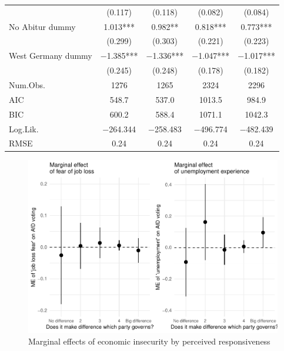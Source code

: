 \documentclass[
]{article}
\begin{document}
\begin{table}[!h]
\begin{tabular}[t]{lcccc}
 & (\num{0.117}) & (\num{0.118}) & (\num{0.082}) & (\num{0.084})\\
No Abitur dummy & \num{1.013}*** & \num{0.982}** & \num{0.818}*** & \num{0.773}***\\
 & (\num{0.299}) & (\num{0.303}) & (\num{0.221}) & (\num{0.223})\\
West Germany dummy & \num{-1.385}*** & \num{-1.336}*** & \num{-1.047}*** & \num{-1.017}***\\
 & (\num{0.245}) & (\num{0.248}) & (\num{0.178}) & (\num{0.182})\\
\midrule
Num.Obs. & \num{1276} & \num{1265} & \num{2324} & \num{2296}\\
AIC & \num{548.7} & \num{537.0} & \num{1013.5} & \num{984.9}\\
BIC & \num{600.2} & \num{588.4} & \num{1071.1} & \num{1042.3}\\
Log.Lik. & \num{-264.344} & \num{-258.483} & \num{-496.774} & \num{-482.439}\\
RMSE & \num{0.24} & \num{0.24} & \num{0.24} & \num{0.24}\\
\bottomrule
\end{tabular}
\end{table}

\begin{figure}
\centering
\includegraphics{AVCD_Draft_Assignment_Pruned_files/figure-latex/regression-results-1-plot1-1.pdf}
\caption{Marginal effects of economic insecurity by perceived
responsiveness}
\end{figure}
\end{document}
